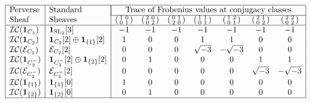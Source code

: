 \documentclass[10pt]{amsart}
\theoremstyle{plain}
\theoremstyle{definition}
\DeclareMathOperator{\SL}{SL}
\newcommand{\cs}[1]{{\mathcal{#1}}}
\newcommand{\IC}{\mathcal{IC}}
\begin{document}
\begin{spacing}{1.3}
\[
\begin{array}{|l|l|ccccccc|}
\hline
\text{Perverse} & \text{Standard} & \multicolumn{7}{|c|}{\text{Trace of Frobenius values at conjugacy classes}} \\ \cline{3-9}
\text{Sheaf} & \text{Sheaves} & (\begin{smallmatrix}1 & 0 \\ 0 & 1\end{smallmatrix}) & (\begin{smallmatrix} 2 & 0\\ 0 & 2\end{smallmatrix}) & (\begin{smallmatrix}0 & 1 \\ 2 & 0\end{smallmatrix})  & (\begin{smallmatrix} 1 & 1\\ 0 & 1 \end{smallmatrix})  & (\begin{smallmatrix}1 & 2 \\ 0 & 1 \end{smallmatrix}) & (\begin{smallmatrix} 2 & 1\\ 0 & 2 \end{smallmatrix})  & (\begin{smallmatrix}2 & 2 \\ 0 & 2 \end{smallmatrix}) \\
\hline
\IC(\mathbf{1}_{C_3})  &  \mathbf{1}_{\SL_2}[3]  & -1 & -1 & -1 & -1 & -1 & -1 & -1 \\
 \IC(\mathbf{1}_{C_2})  &  \mathbf{1}_{C_2}[2] \oplus \mathbf{1}_{\{1\}}[2]  & 1 & 0 & 0 & 1 & 1 & 0 & 0 \\
 \IC(\cs{E}_{C_2})  &  \cs{E}_{C_2}[2]  & 0 & 0 & 0 &  \sqrt{-3}  &  -\sqrt{-3} & 0 & 0 \\
 \IC(\mathbf{1}_{C_2^-})  &  \mathbf{1}_{C_2^-}[2] \oplus \mathbf{1}_{\{2\}}[2]  & 0 & 1 & 0 & 0 & 0 & 1 & 1 \\
 \IC(\cs{E}_{C_2^-})  &  \cs{E}_{C_2^-}[2]  & 0 & 0 & 0 & 0 & 0 &   \sqrt{-3}  &   -\sqrt{-3}  \\
 \IC(\mathbf{1}_{\{1\}})  &  \mathbf{1}_{\{1\}}[0]  & 1 & 0 & 0 & 0 & 0 & 0 & 0 \\
 \IC(\mathbf{1}_{\{2\}})  &  \mathbf{1}_{\{2\}}[0]  & 0 & 1 & 0 & 0 & 0 & 0 & 0 \\
\hline
\end{array}
\]
\end{spacing}
\end{document}
